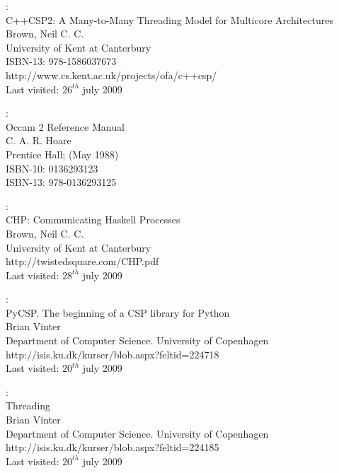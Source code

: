 \documentclass[a4paper,12pt]{article}
\begin{document}
\begin{thebibliography}{99}
\newpage
{}
:\\
C++CSP2: A Many-to-Many Threading Model for Multicore Architectures\\
Brown,  Neil C. C.\\
University of Kent at Canterbury\\
ISBN-13: 978-1586037673\\
http://www.cs.kent.ac.uk/projects/ofa/c++csp/\\
Last visited: $26^{th}$ july 2009

:\\
Occam 2 Reference Manual\\
C. A. R. Hoare\\
Prentice Hall; (May 1988)\\
ISBN-10: 0136293123\\
ISBN-13: 978-0136293125

:\\
CHP: Communicating Haskell Processes\\
Brown,  Neil C. C.\\
University of Kent at Canterbury\\
http://twistedsquare.com/CHP.pdf\\
Last visited: $28^{th}$ july 2009


:\\
PyCSP. The beginning of a CSP library for Python\\
Brian Vinter\\
Department of Computer Science. University of Copenhagen\\
http://isis.ku.dk/kurser/blob.aspx?feltid=224718\\
Last visited: $20^{th}$ july 2009

:\\
Threading\\
Brian Vinter\\
Department of Computer Science. University of Copenhagen\\
http://isis.ku.dk/kurser/blob.aspx?feltid=224185\\
Last visited: $20^{th}$ july 2009

\end{thebibliography}
\end{document}
